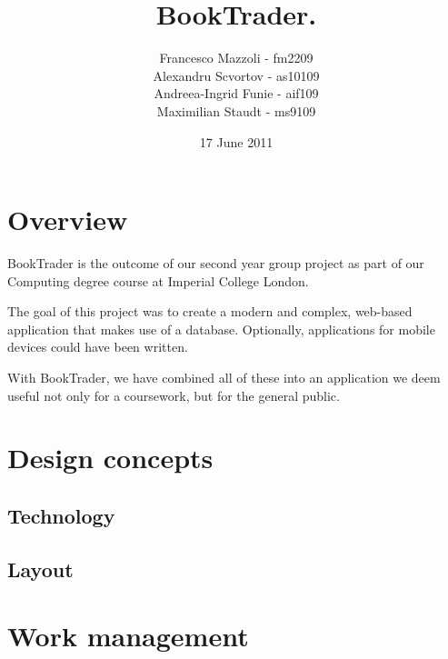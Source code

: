 \documentclass[11pt,a4paper]{article}
\begin{document}




\title{BookTrader.}

\author
{
  Francesco Mazzoli - fm2209\\
  Alexandru Scvortov - as10109\\
  Andreea-Ingrid Funie - aif109\\
  Maximilian Staudt - ms9109
}

\date{17 June 2011}

\maketitle



\section{Overview}


BookTrader is the outcome of our second year group project as part
of our Computing degree course at Imperial College London.

The goal of this project was to create a modern and complex,
web-based application that makes use of a database. Optionally,
applications for mobile devices could have been written.

With BookTrader, we have combined all of these into an application
we deem useful not only for a coursework, but for the general
public.



\section{Design concepts}

\subsection{Technology}




\subsection{Layout}




\section{Work management}
\end{document}

